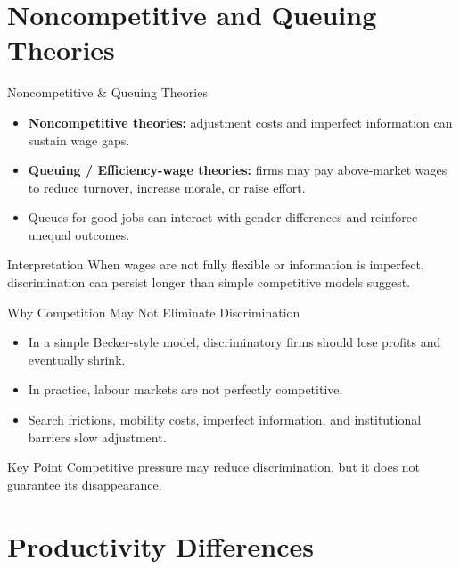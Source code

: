 \documentclass[aspectratio=169]{beamer}
\begin{document}
\section{Noncompetitive and Queuing Theories}

\begin{frame}{Noncompetitive \& Queuing Theories}
\transfade
\begin{itemize}
  \item \textbf{Noncompetitive theories:} adjustment costs and imperfect information can sustain wage gaps.
  \item \textbf{Queuing / Efficiency-wage theories:} firms may pay above-market wages to reduce turnover, increase morale, or raise effort.
  \item Queues for good jobs can interact with gender differences and reinforce unequal outcomes.
\end{itemize}

\begin{block}{Interpretation}
When wages are not fully flexible or information is imperfect, discrimination can persist longer than simple competitive models suggest.
\end{block}
\end{frame}

\begin{frame}{Why Competition May Not Eliminate Discrimination}
\transfade
\begin{itemize}
  \item In a simple Becker-style model, discriminatory firms should lose profits and eventually shrink.
  \item In practice, labour markets are not perfectly competitive.
  \item Search frictions, mobility costs, imperfect information, and institutional barriers slow adjustment.
\end{itemize}

\begin{block}{Key Point}
Competitive pressure may reduce discrimination, but it does not guarantee its disappearance.
\end{block}
\end{frame}

\section{Productivity Differences}
\end{document}
